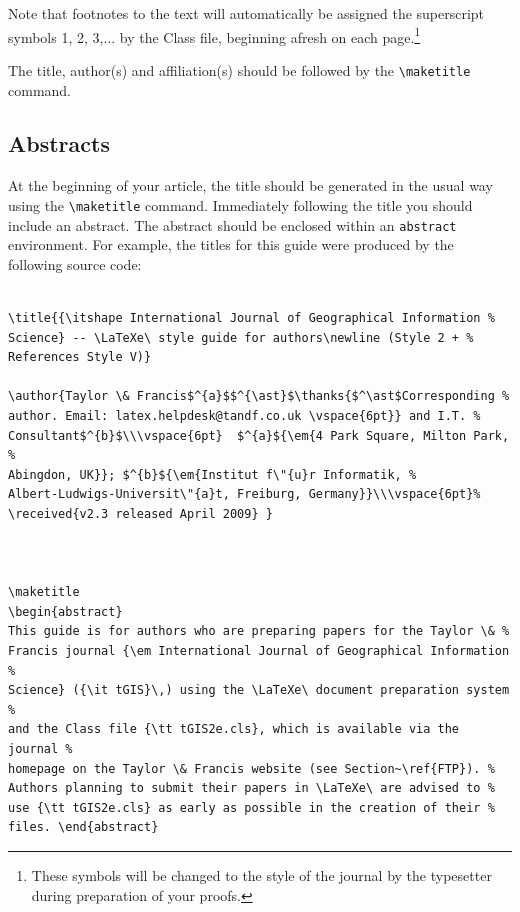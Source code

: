 \documentclass[]{tGIS2e}
\begin{document}
Note that footnotes to the text will automatically be assigned the superscript
 symbols 1, 2, 3,... by the Class file, beginning afresh on each
page.\footnote{These symbols will be changed to the style of the journal by the
 typesetter during preparation of your proofs.}

The title, author(s) and affiliation(s) should be followed by the {\verb"\maketitle"} command.

\subsection{Abstracts}

At the beginning of your article, the title should be generated in the usual way using the {\verb"\maketitle"}
command. Immediately following the title you should include an abstract. The abstract should be enclosed within
an {\tt abstract} environment. For example, the titles for this guide were produced by the following source code:
%
\begin{verbatim}

\title{{\itshape International Journal of Geographical Information %
Science} -- \LaTeXe\ style guide for authors\newline (Style 2 + %
References Style V)}

\author{Taylor \& Francis$^{a}$$^{\ast}$\thanks{$^\ast$Corresponding %
author. Email: latex.helpdesk@tandf.co.uk \vspace{6pt}} and I.T. %
Consultant$^{b}$\\\vspace{6pt}  $^{a}${\em{4 Park Square, Milton Park, %
Abingdon, UK}}; $^{b}${\em{Institut f\"{u}r Informatik, %
Albert-Ludwigs-Universit\"{a}t, Freiburg, Germany}}\\\vspace{6pt}%
\received{v2.3 released April 2009} }



\maketitle
\begin{abstract}
This guide is for authors who are preparing papers for the Taylor \& %
Francis journal {\em International Journal of Geographical Information %
Science} ({\it tGIS}\,) using the \LaTeXe\ document preparation system %
and the Class file {\tt tGIS2e.cls}, which is available via the journal %
homepage on the Taylor \& Francis website (see Section~\ref{FTP}). %
Authors planning to submit their papers in \LaTeXe\ are advised to %
use {\tt tGIS2e.cls} as early as possible in the creation of their %
files. \end{abstract}

\end{verbatim}
\end{document}
